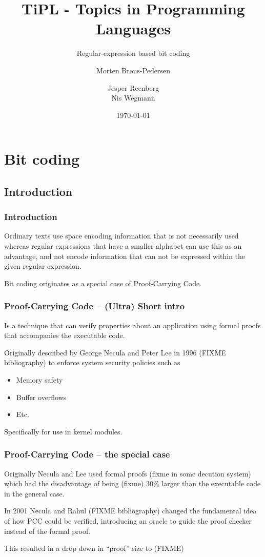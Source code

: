 \documentclass[slidestop,compress,mathserif, xcolor=table]{beamer}
\title[]{TiPL - Topics in Programming Languages}
\subtitle{Regular-expression based bit coding}
\author[Morten Brøns-Pedersen \and Jesper Reenberg \and Nis Wegmann]
       {Morten Brøns-Pedersen \and
        Jesper Reenberg  \\
        Nis Wegmann }
\institute[DIKU]{Department of Computer Science}
\date[]{\today}
\begin{document}
\frame[plain]{\titlepage}

\section{Bit coding}

\subsection{Introduction}

\begin{frame}
  \frametitle{Introduction}
  
  Ordinary texts use space encoding information that is not necessarily used whereas
  regular expressions that have a smaller alphabet can use this as an advantage,
  and not encode information that can not be expressed within the given regular
  expression.
  
  Bit coding originates as a special case of Proof-Carrying Code.
  
\end{frame}

\begin{frame}
  \frametitle{Proof-Carrying Code -- (Ultra) Short intro}
  
  \begin{definition}[Weak]
    Is a technique that can verify properties about an application using formal
    proofs that accompanies the executable code.
  \end{definition}

  Originally described by George Necula and Peter Lee in 1996 (FIXME
  bibliography) to enforce system security policies such as

  \begin{itemize}
  \item Memory safety
  \item Buffer overflows
  \item Etc.
  \end{itemize}

  Specifically for use in kernel modules.

\end{frame}

\begin{frame}
  \frametitle{Proof-Carrying Code -- the special case}

  Originally Necula and Lee used formal proofs (fixme in some decution system)
  which had the disadvantage of being (fixme) 30\% larger than the executable
  code in the general case.

  In 2001 Necula and Rahul (FIXME bibliography) changed the fundamental idea of
  how PCC could be verified, introducing an oracle to guide the proof checker
  instead of the formal proof.

  This resulted in a drop down in ``proof'' size to (FIXME)
  
\end{frame}
\end{document}
